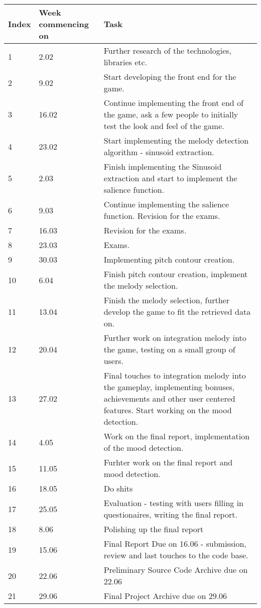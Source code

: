 \begin{center}
\begin{tabular}{| l | l | p{9cm} |}
\hline
    Index & Week commencing on  & Task  \\ \hline
    1 & 2.02 & Further research of the technologies, libraries etc.\\ \hline
    2 & 9.02 & Start developing the front end for the game. \\ \hline
    3 & 16.02 & Continue implementing the front end of the game, ask a few people to initially test the look and feel of the game. \\ \hline
    4 & 23.02 & Start implementing the melody detection algorithm -  sinusoid extraction.\\ \hline
    5 & 2.03 & Finish implementing the Sinusoid extraction and start to implement the salience function.\\ \hline
    6 & 9.03 & Continue implementing the salience function. Revision for the exams.\\ \hline
    7 & 16.03 & Revision for the exams. \\ \hline
    8 & 23.03 & Exams. \\ \hline
    9 & 30.03 & Implementing pitch contour creation. \\ \hline
    10 & 6.04 & Finish pitch contour creation, implement the melody selection. \\ \hline
    11 & 13.04 & Finish the melody selection, further develop the game to fit the retrieved data on. \\ \hline
    12 & 20.04 & Further work on integration melody into the game, testing on a small group of users. \\ \hline
    13 & 27.02 & Final touches to integration melody into the gameplay, implementing bonuses, achievements and other user centered features. Start working on the mood detection. \\ \hline
    14 & 4.05 & Work on the final report, implementation of the mood detection. \\ \hline
    15 & 11.05 & Furhter work on the final report and mood detection. \\ \hline
    16 & 18.05 & Do shits \\ \hline
    17 & 25.05 & Evaluation - testing with users filling in questionaires, writing the final report. \\ \hline
    18 & 8.06 & Polishing up the final report \\ \hline
    19 & 15.06 & Final Report Due on 16.06 - submission, review and last touches to the code base.\\ \hline
    20 & 22.06 & Preliminary Source Code Archive due on 22.06\\ \hline
    21 & 29.06 & Final Project Archive due on 29.06\\ \hline
    
    \end{tabular}
\end{center}